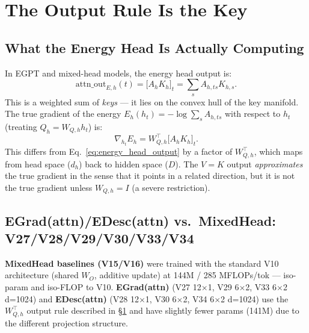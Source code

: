 \section{The Output Rule Is the Key}
\label{sec:output_rule}

\subsection{What the Energy Head Is Actually Computing}

In EGPT and mixed-head models, the energy head output is:
\begin{equation}
  \mathrm{attn\_out}_{E,h}(t) = \bigl[ A_h K_h \bigr]_t = \sum_s A_{h,ts} K_{h,s}. \label{eq:energy_head_output}
\end{equation}
This is a weighted sum of \emph{keys} --- it lies on the convex hull of the key manifold.
The true gradient of the energy $E_h(h_t) = -\log \sum_s A_{h,ts}$ with respect
to $h_t$ (treating $Q_h = W_{Q,h} h_t$) is:
\begin{equation}
  \nabla_{h_t} E_h = W_{Q,h}^\top \bigl[ A_h K_h \bigr]_t. \label{eq:true_egrad}
\end{equation}
This differs from Eq.~\ref{eq:energy_head_output} by a factor of $W_{Q,h}^\top$,
which maps from head space ($d_h$) back to hidden space ($D$).
The $V{=}K$ output \emph{approximates} the true gradient in the sense that it
points in a related direction, but it is not the true gradient unless $W_{Q,h} = I$
(a severe restriction).

\subsection{EGrad(attn)/EDesc(attn) vs.\ MixedHead: V27/V28/V29/V30/V33/V34}

\textbf{MixedHead baselines (V15/V16)} were trained with the standard V10 architecture
(shared $W_O$, additive update) at 144M / 285 MFLOPs/tok --- iso-param and iso-FLOP to V10.
\textbf{EGrad(attn)} (V27 12$\times$1, V29 6$\times$2, V33 6$\times$2 d=1024) and
\textbf{EDesc(attn)} (V28 12$\times$1, V30 6$\times$2, V34 6$\times$2 d=1024) use the
$W_{Q,h}^\top$ output rule described in \S\ref{sec:output_rule} and have slightly fewer
params (141M) due to the different projection structure.

\begin{table}[h]
\centering
\caption{Output-rule ablation (all 12$\times$1, $d{=}768$, 30k steps).
  V15/V16 are MixedHead baselines (shared $W_O$); V27/V28 use $W_{Q,h}^\top$ for energy heads.
  \textbf{Bold} = best per metric.}
\label{tab:output_rule}
\resizebox{0.55\textwidth}{!}{%
}
\end{table}

